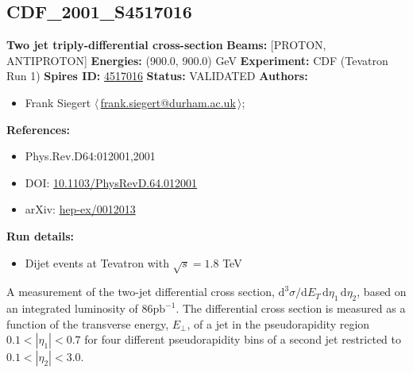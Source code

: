 \subsection[CDF\_2001\_S4517016]{CDF\_2001\_S4517016\,\cite{Affolder:2000ew}}
\textbf{Two jet triply-differential cross-section}\newline
\textbf{Beams:} [PROTON, ANTIPROTON] \newline
\textbf{Energies:} (900.0, 900.0) GeV \newline
\textbf{Experiment:} CDF (Tevatron Run 1) \newline
\textbf{Spires ID:} \href{http://www.slac.stanford.edu/spires/find/hep/www?rawcmd=key+4517016}{4517016}\newline
\textbf{Status:} VALIDATED\newline
\textbf{Authors:}
\begin{itemize}
  \item Frank Siegert $\langle\,$\href{mailto:frank.siegert@durham.ac.uk}{frank.siegert@durham.ac.uk}$\,\rangle$;
\end{itemize}
\textbf{References:}
\begin{itemize}
  \item Phys.Rev.D64:012001,2001
  \item DOI: \href{http://dx.doi.org/10.1103/PhysRevD.64.012001}{10.1103/PhysRevD.64.012001}
  \item arXiv: \href{http://arxiv.org/abs/hep-ex/0012013}{hep-ex/0012013}
\end{itemize}
\textbf{Run details:}
\begin{itemize}

  \item Dijet events at Tevatron with $\sqrt{s}=1.8$ TeV\end{itemize}

\noindent A measurement of the two-jet differential cross section, $\mathrm{d}^3\sigma/\mathrm{d}E_T \, \mathrm{d}\eta_1 \, \mathrm{d}\eta_2$, based on an integrated luminosity of $86 \mathrm{pb}^{-1}$. The differential cross section is measured as a function of the transverse energy, $E_\perp$, of a jet in the pseudorapidity region $0.1 < |\eta_1| < 0.7$ for four different pseudorapidity bins of a second jet restricted to $0.1 < |\eta_2| < 3.0$.

\clearpage


\clearpage

